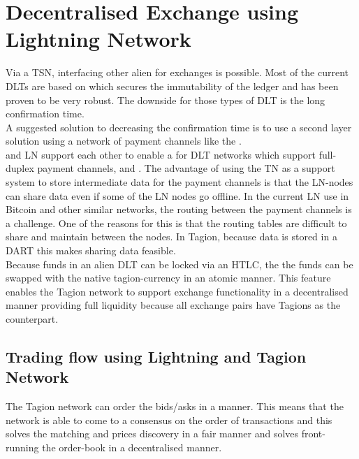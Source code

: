 \section{Decentralised Exchange using Lightning Network} \label{sec:dex}

Via a TSN, interfacing other alien  for exchanges is possible. Most of the current DLTs are based on  which secures the immutability of the ledger and has been proven to be very robust. The downside for those types of DLT is the long confirmation time.\\
A suggested solution to decreasing the confirmation time is to use a second layer solution using a network of payment channels like the .\\
 and LN support each other to enable a  for DLT networks which support full-duplex payment channels,  and .
The advantage of using the TN as a support system to store intermediate data for the payment channels is that the LN-nodes can share data even if some of the LN nodes go offline.
In the current LN use in Bitcoin and other similar networks, the routing between the payment channels is a challenge. One of the reasons for this is that the routing tables are difficult to share and maintain between the nodes. In Tagion, because data is stored in a DART this makes sharing data feasible.\\
Because funds in an alien DLT can be locked via an HTLC, the  the funds can be swapped with the native tagion-currency in an atomic manner. This feature enables the Tagion network to support exchange functionality in a decentralised manner providing full liquidity because all exchange pairs have Tagions as the counterpart.\\

\subsection{Trading flow using Lightning and Tagion Network}
The Tagion network can order the bids/asks in a  manner. This means that the network is able to come to a consensus on the order of transactions and this solves the matching and prices discovery in a fair manner and solves front-running the order-book in a decentralised manner.

